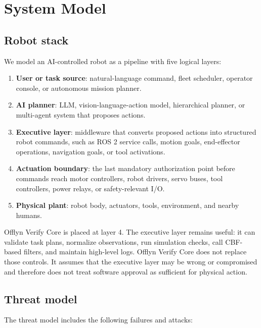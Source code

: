 \documentclass[10pt]{article}
\newcommand{\ovc}{Offlyn Verify Core\xspace}
\begin{document}
\section{System Model}

\subsection{Robot stack}

We model an AI-controlled robot as a pipeline with five logical layers:

\begin{enumerate}[leftmargin=*]
  \item \textbf{User or task source}: natural-language command, fleet scheduler, operator console, or autonomous mission planner.
  \item \textbf{AI planner}: LLM, vision-language-action model, hierarchical planner, or multi-agent system that proposes actions.
  \item \textbf{Executive layer}: middleware that converts proposed actions into structured robot commands, such as ROS 2 service calls, motion goals, end-effector operations, navigation goals, or tool activations.
  \item \textbf{Actuation boundary}: the last mandatory authorization point before commands reach motor controllers, robot drivers, servo buses, tool controllers, power relays, or safety-relevant I/O.
  \item \textbf{Physical plant}: robot body, actuators, tools, environment, and nearby humans.
\end{enumerate}

\ovc is placed at layer 4. The executive layer remains useful: it can validate task plans, normalize observations, run simulation checks, call CBF-based filters, and maintain high-level logs. \ovc does not replace those controls. It assumes that the executive layer may be wrong or compromised and therefore does not treat software approval as sufficient for physical action.

\subsection{Threat model}

The threat model includes the following failures and attacks:
\end{document}
